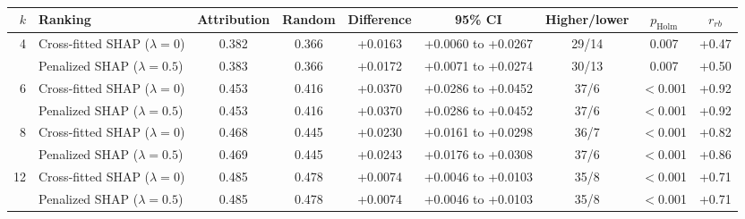 \begin{table}[t]
\centering
\small
\caption{}
\label{tab:h2}
\setlength{\tabcolsep}{4pt}
\begin{adjustbox}{max width=\textwidth}
\begin{tabular}{rlccccccc}
\toprule
$k$ & Ranking & Attribution & Random & Difference & 95\% CI & Higher/lower & $p_{\mathrm{Holm}}$ & $r_{rb}$ \\
\midrule
4 & Cross-fitted SHAP ($\lambda = 0$) & 0.382 & 0.366 & +0.0163 & +0.0060 to +0.0267 & 29/14 & 0.007 & +0.47 \\
 & Penalized SHAP ($\lambda = 0.5$) & 0.383 & 0.366 & +0.0172 & +0.0071 to +0.0274 & 30/13 & 0.007 & +0.50 \\
\midrule 6 & Cross-fitted SHAP ($\lambda = 0$) & 0.453 & 0.416 & +0.0370 & +0.0286 to +0.0452 & 37/6 & $<$0.001 & +0.92 \\
 & Penalized SHAP ($\lambda = 0.5$) & 0.453 & 0.416 & +0.0370 & +0.0286 to +0.0452 & 37/6 & $<$0.001 & +0.92 \\
\midrule 8 & Cross-fitted SHAP ($\lambda = 0$) & 0.468 & 0.445 & +0.0230 & +0.0161 to +0.0298 & 36/7 & $<$0.001 & +0.82 \\
 & Penalized SHAP ($\lambda = 0.5$) & 0.469 & 0.445 & +0.0243 & +0.0176 to +0.0308 & 37/6 & $<$0.001 & +0.86 \\
\midrule 12 & Cross-fitted SHAP ($\lambda = 0$) & 0.485 & 0.478 & +0.0074 & +0.0046 to +0.0103 & 35/8 & $<$0.001 & +0.71 \\
 & Penalized SHAP ($\lambda = 0.5$) & 0.485 & 0.478 & +0.0074 & +0.0046 to +0.0103 & 35/8 & $<$0.001 & +0.71 \\
\bottomrule
\end{tabular}
\end{adjustbox}
\end{table}
